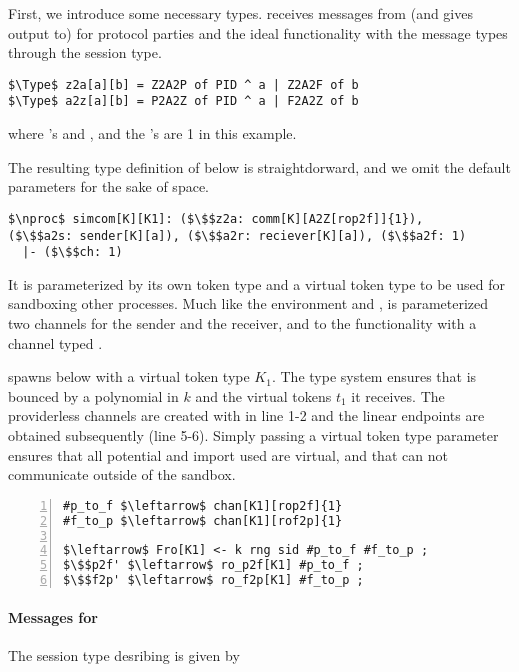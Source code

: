 First, we introduce some necessary types. 
\simcom receives messages from (and gives output to) \Z for protocol parties and the ideal functionality with the message types through the  session type. 

\begin{lstlisting}[basicstyle=\footnotesize\BeraMonottFamily, mathescape]
$\Type$ z2a[a][b] = Z2A2P of PID ^ a | Z2A2F of b 
$\Type$ a2z[a][b] = P2A2Z of PID ^ a | F2A2Z of b
\end{lstlisting}
where 's  and , and the 's are 1 in this example.  

The resulting type definition of \simcom below is straightdorward, and we omit the default parameters for the sake of space.
\begin{lstlisting}[basicstyle=\footnotesize\BeraMonottFamily, mathescape, frame=single]
$\nproc$ simcom[K][K1]: ($\$$z2a: comm[K][A2Z[rop2f]]{1}),
($\$$a2s: sender[K][a]), ($\$$a2r: reciever[K][a]), ($\$$a2f: 1) 
  |- ($\$$ch: 1)
\end{lstlisting}
It is parameterized by its own token type  and a virtual token type  to be used for sandboxing other processes.
Much like the environment and \Fcom, \simcom is parameterized  two channels for the sender and the receiver, and to the functionality with a channel typed .

\simcom spawns \Fro below with a virtual token type $K_1$. The type system ensures that \Fro is bounced by a polynomial \GlobalF in  $k$ and the virtual tokens $t_1$ it receives.
The providerless channels are created with  in line 1-2 and the linear endpoints are obtained subsequently (line 5-6).
Simply passing a virtual token type parameter ensures that all potential and import used are virtual, and that \Fro can not communicate outside of the sandbox.
\begin{lstlisting}[basicstyle=\footnotesize\BeraMonottFamily, mathescape, frame=single, numbers=left, xleftmargin=2em, xrightmargin=2em]
#p_to_f $\leftarrow$ chan[K1][rop2f]{1}
#f_to_p $\leftarrow$ chan[K1][rof2p]{1}

$\leftarrow$ Fro[K1] <- k rng sid #p_to_f #f_to_p ;
$\$$p2f' $\leftarrow$ ro_p2f[K1] #p_to_f ;
$\$$f2p' $\leftarrow$ ro_f2p[K1] #f_to_p ;
\end{lstlisting}


\paragraph{Messages for \Fro}
The session type desribing \Fro is given by

